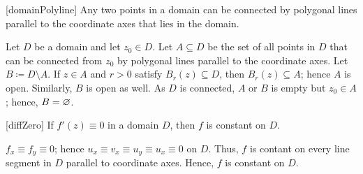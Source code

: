 \documentclass[../complex_variables_1.tex]{subfiles}
\begin{document}
\begin{Theorem}{}[domainPolyline]
    Any two points in a domain can be connected by polygonal lines
    parallel to the coordinate axes
    that lies in the domain.
\end{Theorem}
\begin{myproof}[Proof]
    Let \(D\) be a domain and let \(z_0 \in D\).
    Let \(A \subseteq D\) be the set of all points in \(D\)
    that can be connected from \(z_0\) by polygonal lines parallel to the coordinate axes.
    Let \(B \coloneqq D \setminus A\).
    If \(z \in A\) and \(r > 0\) satisfy \(B_r(z) \subseteq D\), then
    \(B_r(z) \subseteq A\); hence \(A\) is open.
    Similarly, \(B\) is open as well.
    As \(D\) is connected, \(A\) or \(B\) is empty but \(z_0 \in A\); hence, \(B = \varnothing\).
\end{myproof}

\begin{Theorem}{}[diffZero]
    If \(f'(z) \equiv 0\) in a domain \(D\), then \(f\) is constant on \(D\).
\end{Theorem}
\begin{myproof}[Proof]
    \(f_x \equiv f_y \equiv 0\); hence \(u_x \equiv v_x \equiv u_y \equiv u_x \equiv 0\) on \(D\).
    Thus, \(f\) is contant on every line segment in \(D\) parallel to coordinate axes.
    Hence, \(f\) is constant on \(D\).
\end{myproof}
\end{document}
